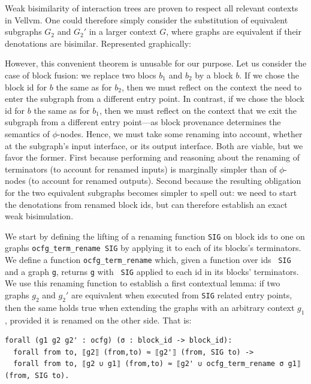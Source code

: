 \documentclass[11pt]{article}
\newcommand{\inlinecoq}[1]{\mbox{\lstinline[style=customcoq,columns=fixed,basewidth=.48em]{#1}}}
\newcommand{\ilc}[1]{\inlinecoq{#1}}
\newcommand{\gr}[1]{\textcolor{Orange}{#1}}
\newcommand{\yzt}[1]{\textcolor{ForestGreen!50}{#1}}
\begin{document}
\yzt{Weak bisimilarity of interaction trees are proven to respect all relevant contexts in Vellvm. One could therefore simply consider the substitution of equivalent subgraphs $G_2$ and $G_2'$ in a larger context $G$, where graphs are equivalent if their denotations are bisimilar. Represented graphically:}

\yzt{However, this convenient theorem is unusable for our purpose. Let us consider the case of block fusion: we replace two blocs $b_1$ and $b_2$ by a block $b$.
If we chose the block id for $b$ the same as for $b_2$, then we must reflect on the context the need to enter the subgraph from a different entry point.
In contrast, if we chose the block id for $b$ the same as for $b_1$, then we must reflect on the context that we exit the subgraph from a different entry point---as block provenance determines the semantics of $\phi$-nodes.}
\yzt{Hence, we must take some renaming into account, whether at the subgraph's input interface, or its output interface. Both are viable, but we favor the former. First because performing and reasoning about the renaming of terminators (to account for renamed inputs) is marginally simpler than of $\phi$-nodes (to account for renamed outputs). Second because the resulting obligation for the two equivalent subgraphs becomes simpler to spell out: we need to start the denotations from renamed block ids, but can therefore establish an exact weak bisimulation.}

We start by defining the lifting of a renaming function \ilc{SIG} on block ids to one on graphs \ilc{ocfg_term_rename SIG} by applying it to each of its blocks's terminators.
We define a function \ilc{ocfg_term_rename} which, given a function over ids~ \ilc{SIG} and a graph \ilc{g}, returns \ilc{g} with~ \ilc{SIG} applied to each id in its blocks' terminators.
We use this renaming function to establish a first contextual lemma: if two graphs $g_2$ and $g_2'$ are equivalent when executed from \ilc{SIG} related entry points, then the same holds true when extending the graphs with an arbitrary context $g_1$, provided it is renamed on the other side. That is:
  \begin{lstlisting}[style=customcoq,basicstyle=\small\ttfamily]
forall (g1 g2 g2' : ocfg) (σ : block_id -> block_id):
  forall from to, ⟦g2⟧ (from,to) ≈ ⟦g2'⟧ (from, SIG to) ->
  forall from to, ⟦g2 ∪ g1⟧ (from,to) ≈ ⟦g2' ∪ ocfg_term_rename σ g1⟧ (from, SIG to).
  \end{lstlisting}
\end{document}
